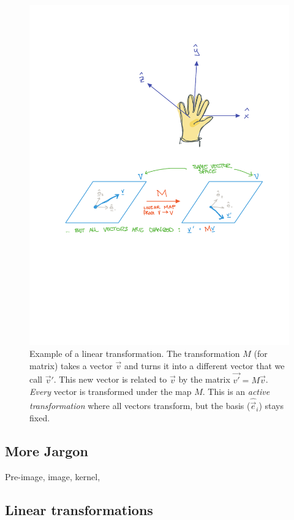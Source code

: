 \documentclass[12pt]{article}
\begin{document}
\begin{figure}[tb]
    \centering
    \includegraphics[width=\textwidth]{figures/lineartransformation.pdf}
    \caption{Example of a linear transformation. The transformation $M$ (for matrix) takes a vector $\vec{v}$ and turns it into a different vector that we call $\vec{v}'$. This new vector is related to $\vec{v}$ by the matrix $\vec{v'}=M\vec{v}$. \emph{Every} vector is transformed under the map $M$. This is an \emph{active transformation} where all vectors transform, but the basis ($\hat{\vec{e}}_i$) stays fixed.}
    \label{fig:Linear Transformation}
\end{figure}

\subsection{More Jargon}



Pre-image, image, kernel, 

\subsection{Linear transformations}
\end{document}
